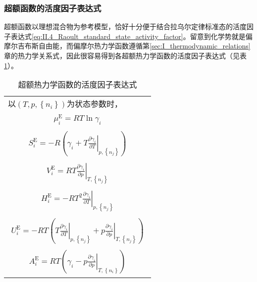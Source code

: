 \documentclass[main.tex]{subfiles}
\begin{document}
\subsubsection{超额函数的活度因子表达式}
超额函数以理想混合物为参考模型，恰好十分便于结合拉乌尔定律标准态的活度因子表达式\eqref{eq:II.4_Raoult_standard_state_activity_factor}。留意到化学势就是偏摩尔吉布斯自由能，而偏摩尔热力学函数遵循第\ref{sec:I_thermodynamic_relations}章的热力学关系式，因此很容易得到各超额热力学函数的活度因子表达式（见表\ref{tab:excess_functions_activity_factor}）。
\begin{longtable}{m{}}
    \caption{超额热力学函数的活度因子表达式}\label{tab:excess_functions_activity_factor}                                                                                                                                      \\
    \hline
    以$\left(T,p,\left\{n_i\right\}\right)$为状态参数时，                                                                                                                                                              \\ [-4ex]


    \begin{align}    \mu_i^\text{E}  =RT\ln\gamma_i    \end{align}                                                                                                                                             \\ [-8ex]
    \begin{align}S_i^\text{E}    =-R\left(\gamma_i+T\left.\frac{\partial\gamma_i}{\partial T}\right|_{p,\left\{n_j\right\}}\right)\end{align}                                                                  \\[-8ex]
    \begin{align}V_i^\text{E}    =RT\left.\frac{\partial\gamma_i}{\partial p}\right|_{T,\left\{n_j\right\}}\end{align}                                                                                         \\[-8ex]
    \begin{align}H_i^\text{E}    =-RT^2\left.\frac{\partial\gamma_i}{\partial T}\right|_{p,\left\{n_j\right\}}\end{align}                                                                                      \\[-8ex]
    \begin{align}U_i^\text{E}    =-RT\left(T\left.\frac{\partial\gamma_i}{\partial T}\right|_{p,\left\{n_j\right\}}+p\left.\frac{\partial\gamma_i}{\partial p}\right|_{T,\left\{n_j\right\}}\right)\end{align} \\[-8ex]
    \begin{align}A_i^\text{E}    =RT\left(\gamma_i-p\left.\frac{\partial\gamma_i}{\partial p}\right|_{T,\left\{n_i\right\}}\right)\end{align}                                                                  \\
    \hline
\end{longtable}
\end{document}
